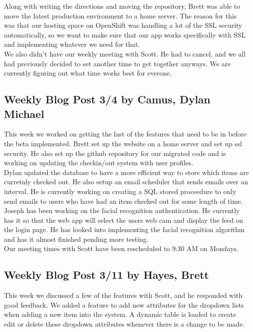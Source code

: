 \documentclass[10pt, onecolumn, twoside, peerreview]{IEEEtran}
\begin{document}
Along with writing the directions and moving the repository, Brett was able to move the latest production environment to a home server. The reason for this was that our hosting space on OpenShift was handling a lot of the SSL security automatically, so we want to make sure that our app works specifically with SSL​ and implementing whatever we need for that.\\

We also didn't have our weekly meeting with Scott. He had to cancel, and we all had previously decided to set another time to get together anyways. We are currently figuring out what time works best for everone.​

\subsection{Weekly Blog Post 3/4 by Camus, Dylan Michael}
​This week we worked on getting the last of the features that need to be in before the beta implemented. Brett set up the website on a home server and set up ssl security. He also set up the github repository for our migrated code and is working on updating the checkin/out system with user profiles.\\

​Dylan updated the database to have a more efficient way to store which items are curretnly checked out. He also setup an email scheduler that sends emails over an interval. He is currently working on creating a SQL stored proceedure to only send emails to users who have had an item checked out for some length of time.\\

Joseph has been working on the facial recognition authentication. He currently has it so that the web app will select the users web cam and display the feed on the login page. He has looked into implementing the facial recognition algorithm and has it almost finished pending more testing.\\

Our meeting times with Scott have been rescheduled to 9:30 AM on Mondays.

\subsection{Weekly Blog Post 3/11 by Hayes, Brett}
This week we discussed a few of the features with Scott, and​ he responded with good feedback. We added a feature to add new attributes for the dropdown lists when adding a new item into the system. A dynamic table is loaded to create edit or delete these dropdown attributes whenever there is a change to be made.\\
\end{document}
